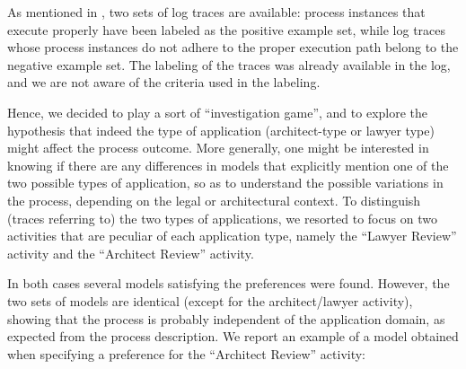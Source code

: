 As mentioned in \cite{DBLP:conf/bpm/SlaatsDB21}, two sets of log traces are available: process instances that execute properly have been labeled as the positive example set, while log traces whose process instances do not adhere to the proper execution path belong to the negative example set. The labeling of the traces was already available in the log, and we are not aware of the criteria used in the labeling.

Hence, we decided to play a sort of ``investigation game'', and to explore the hypothesis that indeed the type of application (architect-type or lawyer type) might affect the process outcome. More generally, one might be interested in knowing if there are any differences in models that explicitly mention one of the two possible types of application, so as to understand the possible variations in the process, depending on the legal or architectural context. To distinguish (traces referring to) the two types of applications, we resorted to focus on two activities that are peculiar of each application type, namely the “Lawyer Review” activity and the “Architect Review” activity.

In both cases several models satisfying the preferences were found. However, the two sets of models are identical (except for the architect/lawyer activity), showing that the process is probably independent of the application domain, as expected from the process description.
We report an example of a model obtained when specifying a preference for the “Architect Review” activity:


